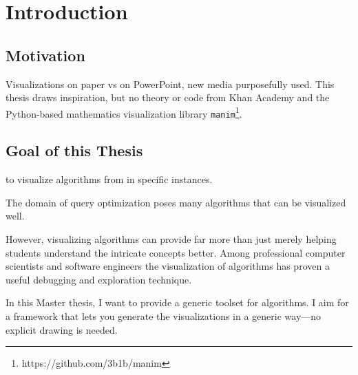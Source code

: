 \section{Introduction}

\subsection{Motivation}
Visualizations on paper vs on PowerPoint, new media purposefully used. This thesis draws inspiration, but no theory or code from Khan Academy and the Python-based mathematics visualization library \texttt{manim}\footnote{https://github.com/3b1b/manim}.

\subsection{Goal of this Thesis}
to visualize algorithms from in specific instances.

The domain of query optimization poses many algorithms that can be visualized well.

However, visualizing algorithms can provide far more than just merely helping students understand the intricate concepts better.
Among professional computer scientists and software engineers the visualization of algorithms has proven a useful debugging and exploration technique.

In this Master thesis, I want to provide a generic toolset for algorithms. I aim for a framework that lets you generate the visualizations in a generic way—no explicit drawing is needed.
